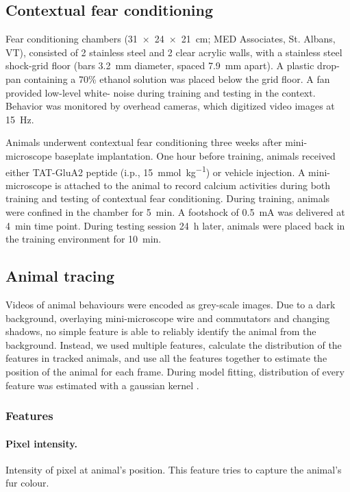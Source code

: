 \subsection{Contextual fear conditioning}
Fear conditioning chambers (\SI{31 x 24 x 21}{\cm}; MED Associates, St. Albans, VT), consisted of 2 stainless steel and 2 clear acrylic walls, with a stainless steel shock-grid floor (bars \SI{3.2}{\mm} diameter, spaced \SI{7.9}{\mm} apart). A plastic drop-pan containing a 70\% ethanol solution was placed below the grid floor. A fan provided low-level white- noise during training and testing in the context. Behavior was monitored by overhead cameras, which digitized video images at \SI{15}{\Hz}. 

Animals underwent contextual fear conditioning three weeks after mini-microscope baseplate implantation. One hour before training, animals received either TAT-GluA2 peptide (i.p., \SI{15}{\mmol\per\kg}) or vehicle injection. A mini-microscope is attached to the animal to record calcium activities during both training and testing of contextual fear conditioning. During training, animals were confined in the chamber for \SI{5}{\minute}. A footshock of \SI{0.5}{\mA} was delivered at \SI{4}{\minute} time point. During testing session \SI{24}{\hour} later, animals were placed back in the training environment for \SI{10}{\minute}. 

\subsection{Animal tracing}
Videos of animal behaviours were encoded as grey-scale images. Due to a dark background, overlaying mini-microscope wire and commutators and changing shadows, no simple feature is able to reliably identify the animal from the background. Instead, we used multiple features, calculate the distribution of the features in tracked animals, and use all the features together to estimate the position of the animal for each frame. During model fitting, distribution of every feature was estimated with a gaussian kernel .

\subsubsection{Features}

\paragraph{Pixel intensity.} Intensity of pixel at animal's position. This feature tries to capture the animal's fur colour.

